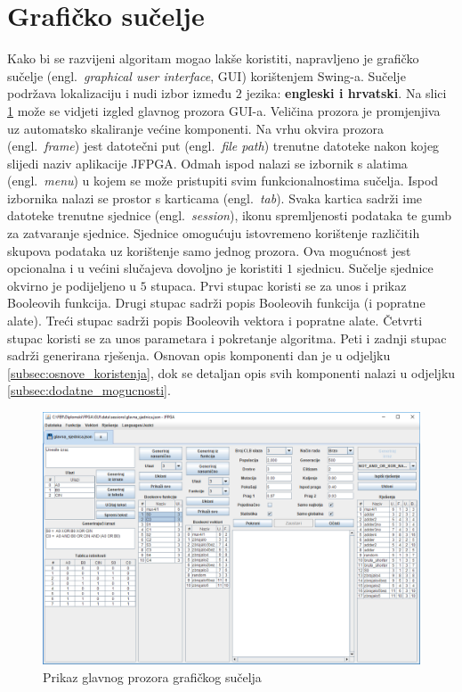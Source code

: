 \documentclass[times, utf8, diplomski]{fer}
\begin{document}

\section{Grafičko sučelje} \label{sec:gui}

Kako bi se razvijeni algoritam mogao lakše koristiti, napravljeno je grafičko sučelje (engl.~\textit{graphical user interface}, GUI) korištenjem Swing-a. Sučelje podržava lokalizaciju i nudi izbor između $2$ jezika: \textbf{engleski i hrvatski}. Na slici \ref{fig:gui} može se vidjeti izgled glavnog prozora GUI-a. Veličina prozora je promjenjiva uz automatsko skaliranje većine komponenti. Na vrhu okvira prozora (engl.~\textit{frame}) jest datotečni put (engl.~\textit{file path}) trenutne datoteke nakon kojeg slijedi naziv aplikacije JFPGA. Odmah ispod nalazi se izbornik s alatima (engl.~\textit{menu}) u kojem se može pristupiti svim funkcionalnostima sučelja. Ispod izbornika nalazi se prostor s karticama (engl.~\textit{tab}). Svaka kartica sadrži ime datoteke trenutne sjednice (engl.~\textit{session}), ikonu spremljenosti podataka te gumb za zatvaranje sjednice. Sjednice omogućuju istovremeno korištenje različitih skupova podataka uz korištenje samo jednog prozora. Ova mogućnost jest opcionalna i u većini slučajeva dovoljno je koristiti $1$ sjednicu. Sučelje sjednice okvirno je podijeljeno u $5$ stupaca. Prvi stupac koristi se za unos i prikaz Booleovih funkcija. Drugi stupac sadrži popis Booleovih funkcija (i popratne alate). Treći stupac sadrži popis Booleovih vektora i popratne alate. Četvrti stupac koristi se za unos parametara i pokretanje algoritma. Peti i zadnji stupac sadrži generirana rješenja. Osnovan opis komponenti dan je u odjeljku \ref{subsec:osnove_koristenja}, dok se detaljan opis svih komponenti nalazi u odjeljku \ref{subsec:dodatne_mogucnosti}.

\begin{figure}[htb]
	\centering
	\includegraphics[width=1.0\textwidth]{img/GUI.png}
	\caption{Prikaz glavnog prozora grafičkog sučelja}
	\label{fig:gui}
\end{figure}
\end{document}
